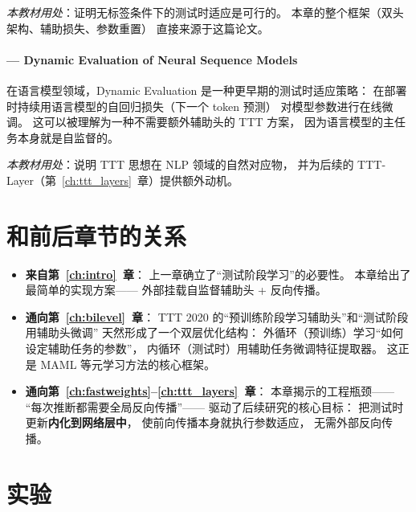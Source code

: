 \textit{本教材用处}：证明无标签条件下的测试时适应是可行的。
本章的整个框架（双头架构、辅助损失、参数重置）
直接来源于这篇论文。

\paragraph{\citet{krause2018dynamiceval} — Dynamic Evaluation of Neural Sequence Models}
在语言模型领域，Dynamic Evaluation 是一种更早期的测试时适应策略：
在部署时持续用语言模型的自回归损失（下一个 token 预测）
对模型参数进行在线微调。
这可以被理解为一种不需要额外辅助头的 TTT 方案，
因为语言模型的主任务本身就是自监督的。

\textit{本教材用处}：说明 TTT 思想在 NLP 领域的自然对应物，
并为后续的 TTT-Layer（第~\ref{ch:ttt_layers}~章）提供额外动机。

\section{和前后章节的关系}
\label{sec:why_test_time_bridges}

\begin{itemize}
  \item \textbf{来自第~\ref{ch:intro}~章}：
    上一章确立了``测试阶段学习''的必要性。
    本章给出了最简单的实现方案——
    外部挂载自监督辅助头 + 反向传播。

  \item \textbf{通向第~\ref{ch:bilevel}~章}：
    TTT 2020 的``预训练阶段学习辅助头''和``测试阶段用辅助头微调''
    天然形成了一个双层优化结构：
    外循环（预训练）学习``如何设定辅助任务的参数''，
    内循环（测试时）用辅助任务微调特征提取器。
    这正是 MAML 等元学习方法的核心框架。

  \item \textbf{通向第~\ref{ch:fastweights}--\ref{ch:ttt_layers}~章}：
    本章揭示的工程瓶颈——
    ``每次推断都需要全局反向传播''——
    驱动了后续研究的核心目标：
    把测试时更新\textbf{内化到网络层中}，
    使前向传播本身就执行参数适应，
    无需外部反向传播。
\end{itemize}

\section{实验}
\label{sec:ttt_lab}

